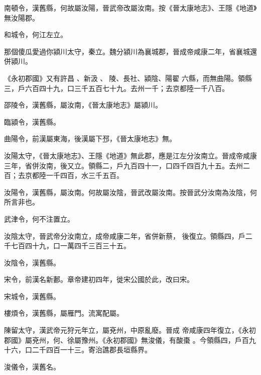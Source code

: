 \begin{pinyinscope}
 南頓令，漢舊縣，何故屬汝陽，晉武帝改屬汝南。按《晉太康地志》、王隱《地道》無汝陽郡。



 和城令，何江左立。



 那個傻瓜愛過你潁川太守，秦立。魏分潁川為襄城郡，晉成帝咸康二年，省襄城還併潁川。


《永初郡國》又有許昌
 、新汲
 、𨻳陵、長社、潁陰、陽翟
 六縣，而無曲陽。領縣三，戶六百四十九，口三千五百七十九。去州一千；去京都陸一千八百。



 邵陵令，漢舊縣，屬汝南，《晉太康地志》屬潁川。



 臨潁令，漢舊縣。



 曲陽令，前漢屬東海，後漢屬下邳，《晉太康地志》無。



 汝陽太守，《晉太康地志》、王隱《地道》無此郡，應是江左分汝南立。晉成帝咸康三年，省併汝南，後又立。領縣二，戶九百四十一，口四千四百九十五。去州二百；去京都陸一千四百，水三千五百。



 汝陽令，漢舊縣，屬汝南。何故屬汝陰，晉武改屬汝南。按晉武分汝南為汝陰，何所言非也。



 武津令，何不注置立。



 汝陰太守，晉武帝分汝南立，成帝咸康二年，省併新蔡，
 後復立。領縣四，戶二千七百四十九，口一萬四千三百三十五。



 汝陰令，漢舊縣。



 宋令，前漢名新郪。章帝建初四年，徙宋公國於此，改曰宋。



 宋城令，漢舊縣。



 樓煩令，漢舊縣，屬雁門。流寓配屬。


陳留太守，漢武帝元狩元年立，屬兗州，中原亂廢。晉成
 帝咸康四年復立，《永初郡國》屬兗州，何、徐屬豫州。《永初郡國》無浚儀，有酸棗
 。今領縣四，戶百九十六，口二千四百一十三。寄治譙郡長垣縣界。



 浚儀令，漢舊名。




\end{pinyinscope}
